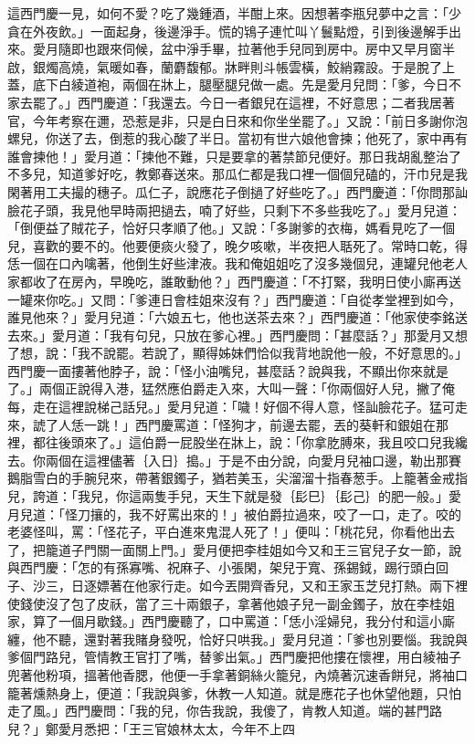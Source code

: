\begin{showcontents}{}
這西門慶一見，如何不愛？吃了幾鍾酒，半酣上來。因想著李瓶兒夢中之言：「少貪在外夜飲。」一面起身，後邊淨手。慌的鴇子連忙叫丫鬟點燈，引到後邊解手出來。愛月隨即也跟來伺候，盆中淨手畢，拉著他手兒同到房中。房中又早月窗半啟，銀燭高燒，氣暖如春，蘭麝馥郁。牀畔則斗帳雲橫，鮫綃霧設。于是脫了上蓋，底下白綾道袍，兩個在牀上，腿壓腿兒做一處。先是愛月兒問：「爹，今日不家去罷了。」西門慶道：「我還去。今日一者銀兒在這裡，不好意思；二者我居著官，今年考察在邇，恐惹是非，只是白日來和你坐坐罷了。」又說：「前日多謝你泡螺兒，你送了去，倒惹的我心酸了半日。當初有世六娘他會揀；他死了，家中再有誰會揀他！」愛月道：「揀他不難，只是要拿的著禁節兒便好。那日我胡亂整治了不多兒，知道爹好吃，教鄭春送來。那瓜仁都是我口裡一個個兒磕的，汗巾兒是我閑著用工夫撮的穗子。瓜仁子，說應花子倒撾了好些吃了。」西門慶道：「你問那訕臉花子頭，我見他早時兩把撾去，喃了好些，只剩下不多些我吃了。」愛月兒道：「倒便益了賊花子，恰好只孝順了他。」又說：「多謝爹的衣梅，媽看見吃了一個兒，喜歡的要不的。他要便痰火發了，晚夕咳嗽，半夜把人聒死了。常時口乾，得恁一個在口內噙著，他倒生好些津液。我和俺姐姐吃了沒多幾個兒，連罐兒他老人家都收了在房內，早晚吃，誰敢動他？」西門慶道：「不打緊，我明日使小廝再送一罐來你吃。」又問：「爹連日會桂姐來沒有？」西門慶道：「自從孝堂裡到如今，誰見他來？」愛月兒道：「六娘五七，他也送茶去來？」西門慶道：「他家使李銘送去來。」愛月道：「我有句兒，只放在爹心裡。」西門慶問：「甚麼話？」那愛月又想了想，說：「我不說罷。若說了，顯得姊妹們恰似我背地說他一般，不好意思的。」西門慶一面摟著他脖子，說：「怪小油嘴兒，甚麼話？說與我，不顯出你來就是了。」兩個正說得入港，猛然應伯爵走入來，大叫一聲：「你兩個好人兒，撇了俺每，走在這裡說梯己話兒。」愛月兒道：「噦！好個不得人意，怪訕臉花子。猛可走來，諕了人恁一跳！」西門慶罵道：「怪狗才，前邊去罷，丟的葵軒和銀姐在那裡，都往後頭來了。」這伯爵一屁股坐在牀上，說：「你拿肐膊來，我且咬口兒我纔去。你兩個在這裡儘著｛入日｝搗。」于是不由分說，向愛月兒袖口邊，勒出那賽鵝脂雪白的手腕兒來，帶著銀鐲子，猶若美玉，尖溜溜十指春葱手。上籠著金戒指兒，誇道：「我兒，你這兩隻手兒，天生下就是發｛髟巳｝｛髟己｝的肥一般。」愛月兒道：「怪刀攘的，我不好罵出來的！」被伯爵拉過來，咬了一口，走了。咬的老婆怪叫，罵：「怪花子，平白進來鬼混人死了！」便叫：「桃花兒，你看他出去了，把籠道子門關一面關上門。」愛月便把李桂姐如今又和王三官兒子女一節，說與西門慶：「怎的有孫寡嘴、祝麻子、小張閑，架兒于寬、孫錫鉞，踢行頭白回子、沙三，日逐嫖著在他家行走。如今丟開齊香兒，又和王家玉芝兒打熱。兩下裡使錢使沒了包了皮祅，當了三十兩銀子，拿著他娘子兒一副金鐲子，放在李桂姐家，算了一個月歇錢。」西門慶聽了，口中罵道：「恁小淫婦兒，我分付和這小廝纏，他不聽，還對著我賭身發呪，恰好只哄我。」愛月兒道：「爹也別要惱。我說與爹個門路兒，管情教王官打了嘴，替爹出氣。」西門慶把他摟在懷裡，用白綾袖子兜著他粉項，搵著他香腮，他便一手拿著銅絲火籠兒，內燒著沉速香餅兒，將袖口籠著燻熱身上，便道：「我說與爹，休教一人知道。就是應花子也休望他題，只怕走了風。」西門慶問：「我的兒，你告我說，我傻了，肯教人知道。端的甚門路兒？」鄭愛月悉把：「王三官娘林太太，今年不上四
\end{showcontents}
